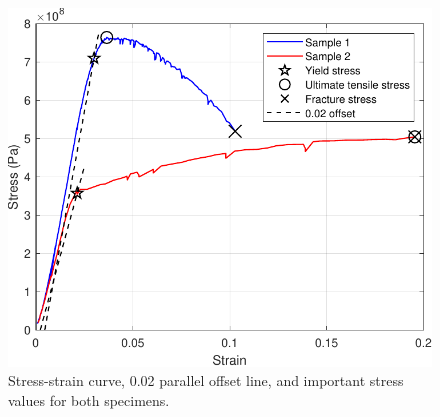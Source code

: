 \documentclass[conference, letterpaper]{IEEEtran}
\begin{document}
    \begin{figure}[htbp]
        \centerline{\includegraphics[width = \linewidth]{lab2curve.pdf}}
        \caption{Stress-strain curve, 0.02 parallel offset line, and important stress values for both specimens.}\label{fgr_1}
    \end{figure}
\end{document}
